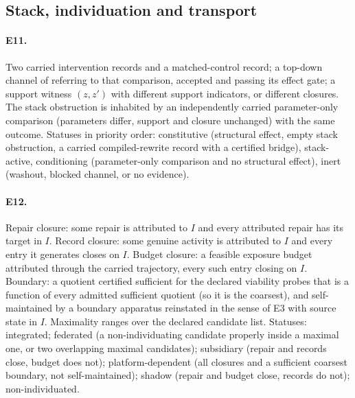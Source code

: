 \subsection{Stack, individuation and transport}

\paragraph{E11.} Two carried intervention records and a matched-control record; a top-down channel
of \FoundIII{} referring to that comparison, accepted and passing its effect gate; a support witness
$(z, z')$ with different support indicators, or different closures. The stack obstruction is inhabited
by an independently carried parameter-only comparison (parameters differ, support and closure
unchanged) with the same outcome. Statuses in priority order: constitutive (structural effect, empty
stack obstruction, a carried compiled-rewrite record with a certified bridge), stack-active,
conditioning (parameter-only comparison and no structural effect), inert (washout, blocked channel,
or no evidence).

\paragraph{E12.} Repair closure: some repair is attributed to $I$ and every attributed repair has its
target in $I$. Record closure: some genuine activity is attributed to $I$ and every entry it generates
closes on $I$. Budget closure: a feasible exposure budget attributed through the carried trajectory,
every such entry closing on $I$. Boundary: a quotient certified sufficient for the declared viability
probes that is a function of every admitted sufficient quotient (so it is the coarsest), and
self-maintained by a boundary apparatus reinstated in the sense of E3 with source state in $I$.
Maximality ranges over the declared candidate list. Statuses: integrated; federated (a
non-individuating candidate properly inside a maximal one, or two overlapping maximal candidates);
subsidiary (repair and records close, budget does not); platform-dependent (all closures and a
sufficient coarsest boundary, not self-maintained); shadow (repair and budget close, records do not);
non-individuated.

